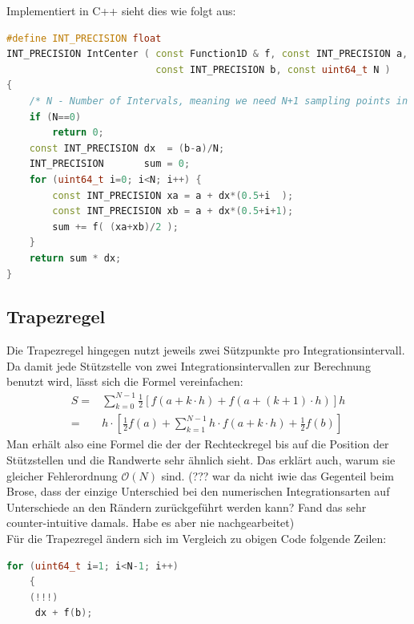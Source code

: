 \documentclass[12pt,a4paper]{article}
\begin{document}
Implementiert in C++ sieht dies wie folgt aus:
\begin{center}\begin{minipage}{0.75\linewidth}
\begin{lstlisting}[language=C++, caption={Die Mittelpunktregel aus Formel~\ref{eq:centralint} implementiert}, label=lst:Mittelpunktregel]
#define INT_PRECISION float
INT_PRECISION IntCenter ( const Function1D & f, const INT_PRECISION a, 
                          const INT_PRECISION b, const uint64_t N )
{
    /* N - Number of Intervals, meaning we need N+1 sampling points in 1D */
    if (N==0)
        return 0;
    const INT_PRECISION dx  = (b-a)/N;
    INT_PRECISION       sum = 0;
    for (uint64_t i=0; i<N; i++) {
        const INT_PRECISION xa = a + dx*(0.5+i  );
        const INT_PRECISION xb = a + dx*(0.5+i+1);
        sum += f( (xa+xb)/2 );
    }
    return sum * dx;
}
\end{lstlisting}\end{minipage}
\end{center}

\subsection{Trapezregel}

Die Trapezregel hingegen nutzt jeweils zwei Sützpunkte pro Integrationsintervall. Da damit jede Stützstelle von zwei Integrationsintervallen zur Berechnung benutzt wird, lässt sich die Formel vereinfachen:
\begin{eqnarray}
	\label{eq:trapeze}
	S = & \sum\limits_{k=0}^{N-1} \frac{1}{2}\left[ f(a+k\cdot h) + f(a+(k+1)\cdot h) \right] h \\
	  = & h\cdot\left[ \frac{1}{2}f(a) + \sum\limits_{k=1}^{N-1} h\cdot f(a+k\cdot h) + \frac{1}{2} f(b)\right]
\end{eqnarray}
Man erhält also eine Formel die der der Rechteckregel bis auf die Position der Stützstellen und die Randwerte sehr ähnlich sieht. Das erklärt auch, warum sie gleicher Fehlerordnung $\mathcal{O}(N)$ sind. (??? war da nicht iwie das Gegenteil beim Brose, dass der einzige Unterschied bei den numerischen Integrationsarten auf Unterschiede an den Rändern zurückgeführt werden kann? Fand das sehr counter-intuitive damals. Habe es aber nie nachgearbeitet)\\

Für die Trapezregel ändern sich im Vergleich zu obigen Code folgende Zeilen:
\begin{center}\begin{minipage}{0.75\linewidth}
\begin{lstlisting}[language=C++,firstnumber=10, caption={Die Trapezregel wie in Formel~\ref{eq:trapeze}}, label=lst:trapezregel]
    for (uint64_t i=1; i<N-1; i++)
    {
    (!!!)
     dx + f(b);
\end{lstlisting}\end{minipage}\end{center}
\end{document}

